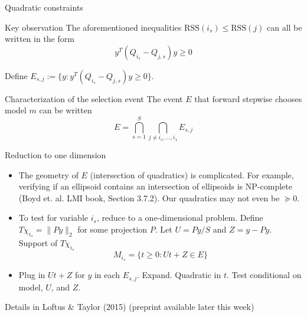 \documentclass{beamer}
\begin{document}
\begin{frame}{Quadratic constraints}

  \begin{block}{Key observation}
    The aforementioned inequalities $\text{RSS}(i_s) \leq \text{RSS}(j)$ can all be written in the form
    \[
    y^T(Q_{i_s} - Q_{j,s})y \geq 0
    \]
  \end{block}

  
  Define $E_{s,j} := \{ y : y^T (Q_{i_s} - Q_{j,s} )y \geq 0 \}$.
  
  \begin{block}{Characterization of the selection event}
    The event $E$ that forward stepwise chooses model $m$ can be
    written
    \[
      E = \bigcap_{s=1}^S \bigcap_{j \neq i_s, \ldots, i_1} E_{s,j}
    \]
  \end{block}

\end{frame}

\begin{frame}{Reduction to one dimension}
  
  \begin{itemize}

  \item The geometry of $E$ (intersection of quadratics) is
    complicated. For example, verifying if an ellipsoid contains an
    intersection of ellipsoids is NP-complete (Boyd et. al. LMI
    book, Section 3.7.2). Our quadratics may not even be $\succeq 0$. 

  \item To test for variable $i_s$, reduce to a one-dimensional
    problem. Define $T\chi_{i_s} = \| P y \|_2$ for some projection
    $P$. Let $U = Py/S$ and $Z = y-Py$. Support of $T\chi_{i_s}$
    \[
    M_{i_s} = \{ t \geq 0 : Ut+Z \in E \}
    \] 

  \item Plug in $Ut+Z$ for $y$ in each $E_{s, j}$. Expand. Quadratic
    in $t$. Test conditional on model, $U$, and $Z$.

  \end{itemize}

 {\footnotesize Details in Loftus \& Taylor (2015) (preprint available later this week)}

\end{frame}
\end{document}
